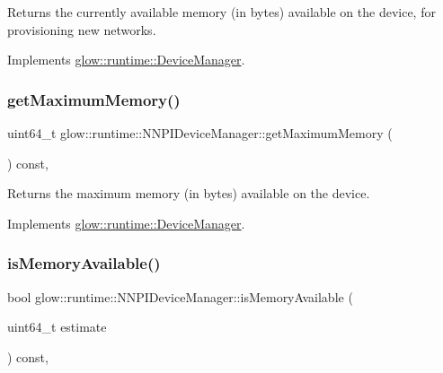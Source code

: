 \begin{DoxyReturn}{Returns}
the currently available memory (in bytes) available on the device, for provisioning new networks. 
\end{DoxyReturn}


Implements \hyperlink{classglow_1_1runtime_1_1_device_manager_a5a84ac3b23b9b6d72f50d763913ed8aa}{glow\+::runtime\+::\+Device\+Manager}.

\mbox{\label{classglow_1_1runtime_1_1_n_n_p_i_device_manager_ae71ea73f150f1c35a735ba06efa871db}} 
\subsubsection{\texorpdfstring{get\+Maximum\+Memory()}{getMaximumMemory()}}
{\footnotesize\ttfamily uint64\+\_\+t glow\+::runtime\+::\+N\+N\+P\+I\+Device\+Manager\+::get\+Maximum\+Memory (\begin{DoxyParamCaption}{ }\end{DoxyParamCaption}) const\hspace{0.3cm}{\ttfamily [override]}, {\ttfamily [virtual]}}

\begin{DoxyReturn}{Returns}
the maximum memory (in bytes) available on the device. 
\end{DoxyReturn}


Implements \hyperlink{classglow_1_1runtime_1_1_device_manager_ad158f1c1f9f32b48927f50d48f80decb}{glow\+::runtime\+::\+Device\+Manager}.

\mbox{\label{classglow_1_1runtime_1_1_n_n_p_i_device_manager_a543e27b561eef6581859d844565c1ac1}} 
\subsubsection{\texorpdfstring{is\+Memory\+Available()}{isMemoryAvailable()}}
{\footnotesize\ttfamily bool glow\+::runtime\+::\+N\+N\+P\+I\+Device\+Manager\+::is\+Memory\+Available (\begin{DoxyParamCaption}\item[{uint64\+\_\+t}]{estimate }\end{DoxyParamCaption}) const\hspace{0.3cm}{\ttfamily [override]}, {\ttfamily [virtual]}}

